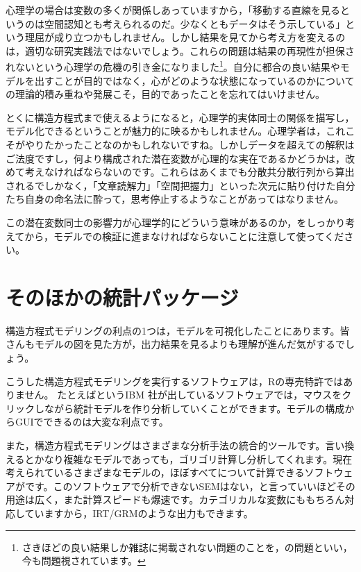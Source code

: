 \documentclass{ltjsbook}
\begin{document}
心理学の場合は変数の多くが関係しあっていますから，「移動する直線を見るというのは空間認知とも考えられるのだ。少なくともデータはそう示している」という理屈が成り立つかもしれません。しかし結果を見てから考え方を変えるのは，適切な研究実践法ではないでしょう。これらの問題は結果の再現性が担保されないという心理学の危機の引き金になりました\footnote{さきほどの良い結果しか雑誌に掲載されない問題のことを，の問題といい，今も問題視されています。}。自分に都合の良い結果やモデルを出すことが目的ではなく，心がどのような状態になっているのかについての理論的積み重ねや発展こそ，目的であったことを忘れてはいけません。

とくに構造方程式まで使えるようになると，心理学的実体同士の関係を描写し，モデル化できるということが魅力的に映るかもしれません。心理学者は，これこそがやりたかったことなのかもしれないですね。しかしデータを超えての解釈はご法度ですし，何より構成された潜在変数が心理的な実在であるかどうかは，改めて考えなければならないのです。これらはあくまでも分散共分散行列から算出されるでしかなく，「文章読解力」「空間把握力」といった次元に貼り付けた自分たち自身の命名法に酔って，思考停止するようなことがあってはなりません。

この潜在変数同士の影響力が心理学的にどういう意味があるのか，をしっかり考えてから，モデルでの検証に進まなければならないことに注意して使ってください。

\section{そのほかの統計パッケージ}

構造方程式モデリングの利点の1つは，モデルを可視化したことにあります。皆さんもモデルの図を見た方が，出力結果を見るよりも理解が進んだ気がするでしょう。

こうした構造方程式モデリングを実行するソフトウェアは，Rの専売特許ではありません。
たとえばというIBM 社が出しているソフトウェアでは，マウスをクリックしながら統計モデルを作り分析していくことができます。モデルの構成からGUIでできるのは大変な利点です。

また，構造方程式モデリングはさまざまな分析手法の統合的ツールです。言い換えるとかなり複雑なモデルであっても，ゴリゴリ計算し分析してくれます。現在考えられているさまざまなモデルの，ほぼすべてについて計算できるソフトウェアがです。このソフトウェアで分析できないSEMはない，と言っていいほどその用途は広く，また計算スピードも爆速です。カテゴリカルな変数にももちろん対応していますから，IRT/GRMのような出力もできます。
\end{document}
